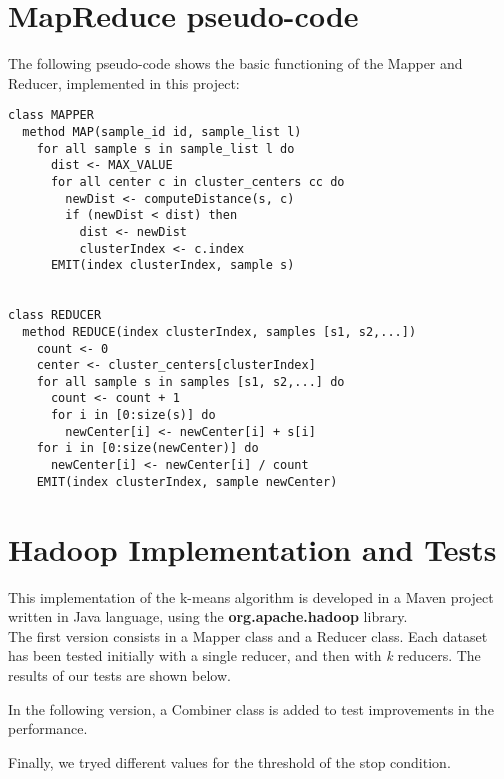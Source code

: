 \documentclass[a4paper, oneside]{article}
\begin{document}
\section{MapReduce pseudo-code}
The following pseudo-code shows the basic functioning of the Mapper and Reducer, implemented in this project:
\begin{verbatim}
class MAPPER
  method MAP(sample_id id, sample_list l)
    for all sample s in sample_list l do
      dist <- MAX_VALUE
      for all center c in cluster_centers cc do
        newDist <- computeDistance(s, c)
        if (newDist < dist) then
          dist <- newDist
          clusterIndex <- c.index
      EMIT(index clusterIndex, sample s)


class REDUCER
  method REDUCE(index clusterIndex, samples [s1, s2,...])
    count <- 0
    center <- cluster_centers[clusterIndex]
    for all sample s in samples [s1, s2,...] do
      count <- count + 1
      for i in [0:size(s)] do
        newCenter[i] <- newCenter[i] + s[i]
    for i in [0:size(newCenter)] do
      newCenter[i] <- newCenter[i] / count
    EMIT(index clusterIndex, sample newCenter)
\end{verbatim}

\section{Hadoop Implementation and Tests}
This implementation of the k-means algorithm is developed in a Maven project written in Java language, using the \textbf{org.apache.hadoop} library.\\

The first version consists in a Mapper class and a Reducer class.
Each dataset has been tested initially with a single reducer, and then with \textit{k} reducers. 
The results of our tests are shown below.


In the following version, a Combiner class is added to test improvements in the performance.


Finally, we tryed different values for the threshold of the stop condition.

\end{document}
